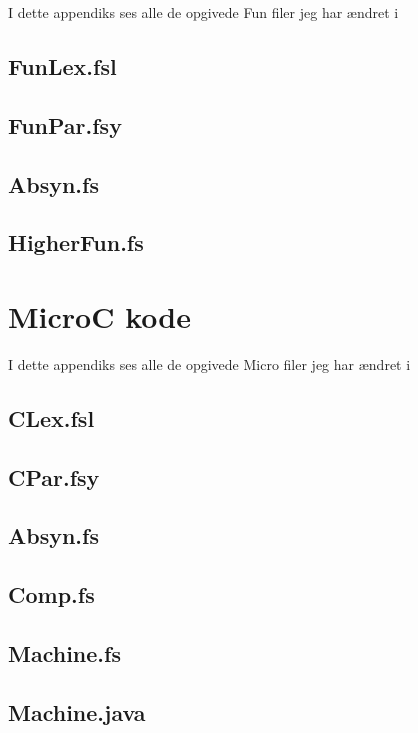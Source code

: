 \documentclass[danish,a4paper]{report}
\begin{document}
I dette appendiks ses alle de opgivede Fun filer jeg har ændret i

\section*{FunLex.fsl}

\section*{FunPar.fsy}

\section*{Absyn.fs}

\section*{HigherFun.fs}

\chapter{MicroC kode}

I dette appendiks ses alle de opgivede Micro filer jeg har ændret i

\section*{CLex.fsl}

\section*{CPar.fsy}

\section*{Absyn.fs}

\section*{Comp.fs}

\section*{Machine.fs}

\section*{Machine.java}


\label{LastPage}
\end{document}

